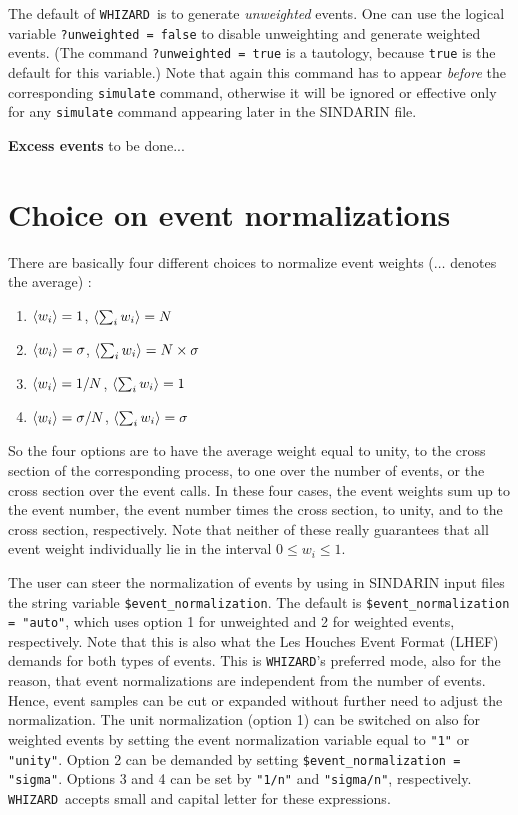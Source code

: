 \documentclass[12pt]{book}
\newcommand{\ttt}[1]{\texttt{#1}}
\newcommand{\whizard}{\texttt{WHIZARD}}
\begin{document}
The default of \whizard\ is to generate {\em unweighted} events. One can
use the logical variable \ttt{?unweighted = false} to disable
unweighting and generate weighted events. (The command
\ttt{?unweighted = true} is a tautology, because \ttt{true} is the
default for this variable.) Note that again this command has to appear
{\em before} the corresponding \ttt{simulate} command, otherwise it will
be ignored or effective only for any \ttt{simulate} command appearing
later in the SINDARIN file.

{\bf Excess events} to be done...


\section{Choice on event normalizations}

There are basically four different choices to normalize event weights
($\ldots$ denotes the average) :
\begin{enumerate}
\item $\mathinner{\langle{w_i}\rangle} = 1$, \qquad\qquad $\Braket{\sum_i w_i} = N$
\item $\mathinner{\langle{w_i}\rangle} = \sigma$, \qquad\qquad $\Braket{\sum_i w_i} = N
  \times \sigma$
\item $\mathinner{\langle{w_i}\rangle} = 1/N$, \quad\qquad $\Braket{\sum_i w_i} = 1$
\item $\mathinner{\langle{w_i}\rangle} = \sigma/N$, \quad\qquad $\Braket{\sum_i w_i} = \sigma$
\end{enumerate}
So the four options are to have the average weight equal to unity, to
the cross section of the corresponding process, to one over the number
of events, or the cross section over the event calls. In these four
cases, the event weights sum up to the event number, the event number
times the cross section, to unity, and to the cross section,
respectively. Note that neither of these really guarantees that all
event weight individually lie in the interval $0 \leq w_i \leq 1$. 

The user can steer the normalization of events by using in SINDARIN
input files the string variable \ttt{\$event\_normalization}. The default is
\ttt{\$event\_normalization = "auto"}, which uses option 1 for
unweighted and 2 for weighted events, respectively. Note that this is
also what the Les Houches Event Format (LHEF) demands for both types
of events. This is \whizard's preferred mode, also for the reason, that
event normalizations are independent from the number of events. Hence,
event samples can be cut or expanded without further need to adjust
the normalization. The unit normalization (option 1) can be switched
on also for weighted events by setting the event normalization
variable equal to \ttt{"1"} or \ttt{"unity"}. Option 2 can be demanded
by setting \ttt{\$event\_normalization = "sigma"}. Options 3 and 4 can
be set by \ttt{"1/n"} and \ttt{"sigma/n"}, respectively. \whizard\
accepts small and capital letter for these expressions. 
\end{document}
